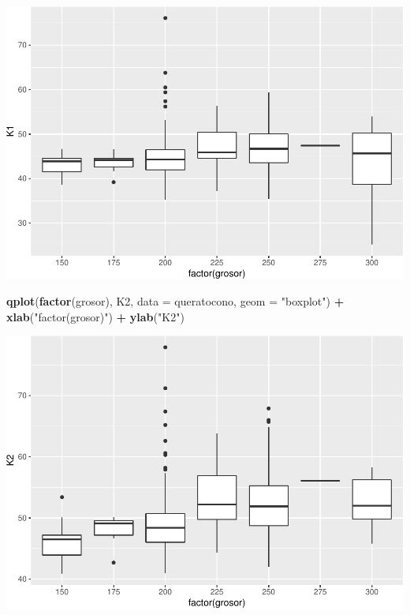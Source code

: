 \documentclass[]{article}
\newenvironment{Shaded}{\begin{snugshade}}{\end{snugshade}}
\newcommand{\DataTypeTok}[1]{\textcolor[rgb]{0.13,0.29,0.53}{#1}}
\newcommand{\KeywordTok}[1]{\textcolor[rgb]{0.13,0.29,0.53}{\textbf{#1}}}
\newcommand{\NormalTok}[1]{#1}
\newcommand{\OperatorTok}[1]{\textcolor[rgb]{0.81,0.36,0.00}{\textbf{#1}}}
\newcommand{\StringTok}[1]{\textcolor[rgb]{0.31,0.60,0.02}{#1}}
\begin{document}
\includegraphics{document_files/figure-latex/unnamed-chunk-8-1.pdf}

\begin{Shaded}
\begin{Highlighting}[]
\KeywordTok{qplot}\NormalTok{(}\KeywordTok{factor}\NormalTok{(grosor), K2, }\DataTypeTok{data =}\NormalTok{ queratocono, }\DataTypeTok{geom =} \StringTok{"boxplot"}\NormalTok{) }\OperatorTok{+}
\StringTok{  }\KeywordTok{xlab}\NormalTok{(}\StringTok{"factor(grosor)"}\NormalTok{) }\OperatorTok{+}\StringTok{ }\KeywordTok{ylab}\NormalTok{(}\StringTok{"K2"}\NormalTok{)}
\end{Highlighting}
\end{Shaded}

\includegraphics{document_files/figure-latex/unnamed-chunk-8-2.pdf}
\end{document}
